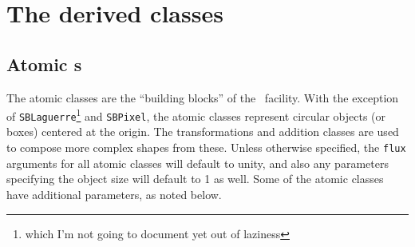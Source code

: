\documentclass[11pt,preprint,flushrt]{aastex}
\begin{document}
\section{The derived classes}
\subsection{Atomic {\sbp}s}
The atomic classes are the ``building blocks'' of the \sbp\ facility.  With the exception of {\tt SBLaguerre}\footnote{which I'm not going to document yet out of laziness} and {\tt SBPixel}, the atomic classes represent circular objects (or boxes) centered at the origin.  The transformations and addition classes are used to compose more complex shapes from these.  Unless otherwise specified, the {\tt flux} arguments for all atomic classes will default to unity, and also any parameters specifying the object size will default to 1 as well.   Some of the atomic classes have additional parameters, as noted below.
\end{document}

